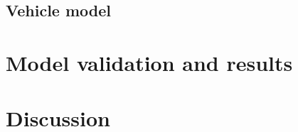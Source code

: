 \documentclass[11pt]{article}
\numberwithin{equation}{section}
\begin{document}
\subsection{Vehicle model}

\section{Model validation and results}
\section{Discussion}

\newpage


\end{document}
